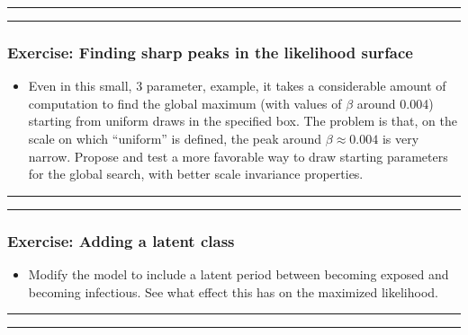 \documentclass[]{article}
\providecommand{\tightlist}{%
  \setlength{\itemsep}{0pt}\setlength{\parskip}{0pt}}
\begin{document}
\begin{center}\rule{0.5\linewidth}{\linethickness}\end{center}

\begin{center}\rule{0.5\linewidth}{\linethickness}\end{center}

\subsubsection{Exercise: Finding sharp peaks in the likelihood
surface}\label{exercise-finding-sharp-peaks-in-the-likelihood-surface}

\begin{itemize}
\tightlist
\item
  Even in this small, 3 parameter, example, it takes a considerable
  amount of computation to find the global maximum (with values of
  \(\beta\) around 0.004) starting from uniform draws in the specified
  box. The problem is that, on the scale on which ``uniform'' is
  defined, the peak around \(\beta\approx 0.004\) is very narrow.
  Propose and test a more favorable way to draw starting parameters for
  the global search, with better scale invariance properties.
\end{itemize}

\begin{center}\rule{0.5\linewidth}{\linethickness}\end{center}

\begin{center}\rule{0.5\linewidth}{\linethickness}\end{center}

\subsubsection{Exercise: Adding a latent
class}\label{exercise-adding-a-latent-class}

\begin{itemize}
\tightlist
\item
  Modify the model to include a latent period between becoming exposed
  and becoming infectious. See what effect this has on the maximized
  likelihood.
\end{itemize}

\begin{center}\rule{0.5\linewidth}{\linethickness}\end{center}

\begin{center}\rule{0.5\linewidth}{\linethickness}\end{center}
\end{document}
